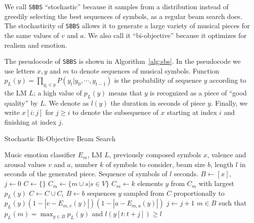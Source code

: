 We call \texttt{SBBS} ``stochastic'' because it samples from a distribution instead of greedily selecting the best sequences of symbols, as a regular beam search does. The stochasticity of \texttt{SBBS} allows it to generate a large variety of musical pieces for the same values of $v$ and $a$.  We
also call it ``bi-objective'' because it optimizes for realism and emotion.

The pseudocode of \texttt{SBBS} is shown in Algorithm~\ref{alg:sbs}. In the pseudocode we use letters $x, y$ and $m$ to denote sequences of musical symbols. Function $p_L(y) = \prod_{y_t \in y} P(y_t|y_0, \cdots, y_{t-1})$ is the probability of sequence $y$ according to the LM $L$; a high value of $p_L(y)$ means that $y$ is recognized as a piece of
``good quality'' by $L$. We denote as $l(y)$ the duration in seconds of piece $y$. Finally, we write $x[i:j]$ for $j \geq i$ to denote the subsequence of $x$ starting at index $i$ and finishing at index $j$.

\begin{algorithm}[t]
\caption{Stochastic Bi-Objective Beam Search}
\label{alg:sbs}
\begin{algorithmic}[1]
\REQUIRE Music emotion classifier $E_m$, LM $L$, previously composed symbols $x$, valence and arousal values $v$ and $a$, number $k$ of symbols to consider, beam size $b$, length $l$ in seconds of the generated piece.
\ENSURE Sequence of symbols of $l$ seconds.
\STATE $B \gets [x]$, $j \gets 0$ \label{line:sbs:init}
{} \label{line:sbs:stopping_condition}
    \STATE $C \gets \{\}$ \label{line:sbs:init_while}
        \STATE $C_m \gets \{m \cup s \vert s \in V\}$ \label{line:sbs:children}
        \STATE $C_m \gets k$ elements $y$ from $C_m$ with largest $p_L(y)$ \label{line:sbs:pruning_model}
        \STATE $C \gets C \cup C_i$ \label{line:sbs:total_children}
    \ENDFOR
    \STATE $B \gets b$ sequences $y$ sampled from $C$ proportionally to $p_L(y) (1 - |v - E_{m,v}(y)|) (1 - |a - E_{m,a}(y)|)$ \label{line:sbs:sample_next_beam}
    \STATE $j \gets j + 1$ \label{line:sbs:end_while}
\ENDWHILE
\RETURN $m \in B$ such that $p_L(m) = \max_{y \in B}p_L(y)$ and $l(y[t: t+j]) \geq l$ \label{line:sbs:return}
\end{algorithmic}
\end{algorithm}

